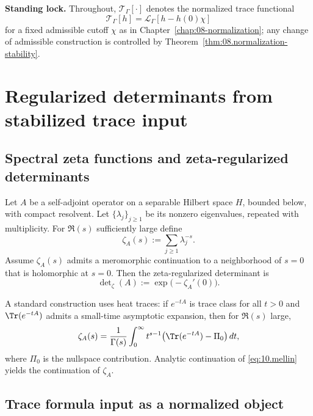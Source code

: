 \medskip
\noindent\textbf{Standing lock.}
Throughout, $\mathcal T_\Gamma[\cdot]$ denotes the normalized trace functional
\[
\mathcal T_\Gamma[h]=\mathcal L_\Gamma[h-h(0)\chi]
\]
for a fixed admissible cutoff $\chi$ as in Chapter~\ref{chap:08-normalization}; any change of admissible construction is
controlled by Theorem~\ref{thm:08.normalization-stability}.

\section{Regularized determinants from stabilized trace input}
\label{sec:10.det}

\subsection{Spectral zeta functions and zeta-regularized determinants}
\label{subsec:10.det.zeta}

Let $A$ be a self-adjoint operator on a separable Hilbert space $H$, bounded below, with compact resolvent.
Let $\{\lambda_j\}_{j\ge1}$ be its nonzero eigenvalues, repeated with multiplicity.
For $\Re(s)$ sufficiently large define
\begin{equation}\label{eq:10.zetaA.def}
\zeta_A(s):=\sum_{j\ge1}\lambda_j^{-s}.
\end{equation}
Assume $\zeta_A(s)$ admits a meromorphic continuation to a neighborhood of $s=0$ that is holomorphic at $s=0$.
Then the zeta-regularized determinant is
\begin{equation}\label{eq:10.detA.def}
\det\nolimits_{\zeta}(A):=\exp\!\bigl(-\zeta_A'(0)\bigr).
\end{equation}

A standard construction uses heat traces: if $e^{-tA}$ is trace class for all $t>0$ and $\Tr(e^{-tA})$ admits a small-time
asymptotic expansion, then for $\Re(s)$ large,
\begin{equation}\label{eq:10.mellin}
\zeta_A(s)=\frac{1}{\Gamma(s)}\int_0^\infty t^{s-1}\bigl(\Tr(e^{-tA})-\Pi_0\bigr)\,dt,
\end{equation}
where $\Pi_0$ is the nullspace contribution. Analytic continuation of \eqref{eq:10.mellin} yields the continuation of $\zeta_A$.

\subsection{Trace formula input as a normalized object}
\label{subsec:10.det.trace-input}

